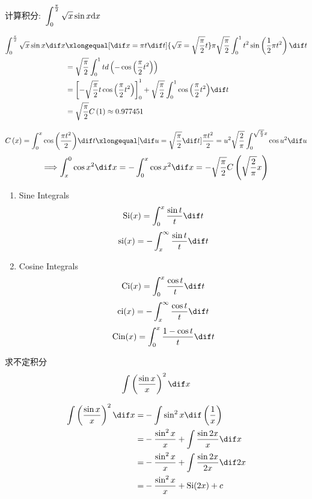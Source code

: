 \documentclass[color=green,titlestyle=hang]{elegantbook}%
\begin{document}
\begin{example}计算积分:~$\displaystyle \int_{\rm{0}}^{\frac{\pi }{{\rm{2}}}} {\sqrt x \sin x} \textrm{d}x$\end{example}
\begin{Solution}\begin{align*}
\int_{0}^{\frac{\pi }{{\rm{2}}}} {\sqrt x \sin x} \dif x &\xlongequal[\dif x = \pi t\dif t]{\sqrt x  = \sqrt {\frac{\pi }{2}} t} \pi \sqrt {\frac{\pi }{2}} \int_0^1 {{t^2}\sin } \left( {\frac{1}{2}\pi {t^2}} \right)\dif t\\
&= \sqrt {\frac{\pi }{2}} \int_0^1 t d\left( { - \cos \left( {\frac{\pi }{2}{t^2}} \right)} \right)\\
&= \left[ { - \sqrt {\frac{\pi }{2}} t\cos \left( {\frac{\pi }{2}{t^2}} \right)} \right]_0^1 + \sqrt {\frac{\pi }{2}} \int_0^1 {\cos \left( {\frac{\pi }{2}{t^2}} \right)} \dif t\\
&= \sqrt {\frac{\pi }{2}} C\left( 1 \right) \approx 0.977451\end{align*}	
\end{Solution}\[C\left( x \right) = \int_0^x {\cos \left( {\frac{{\pi {t^2}}}{2}} \right)} \dif t \xlongequal[{\dif u = \sqrt {\frac{\pi }{2}} \dif t}]{{\frac{{\pi {t^2}}}{2} = {u^2}}}\sqrt {\frac{2}{\pi }} \int_0^{\sqrt {\frac{\pi }{2}} x} {\cos {u^2}\dif u} \]
\[ \Longrightarrow \int_x^0 {\cos {x^2}} \dif x =  - \int_0^x {\cos {x^2}} \dif x =  - \sqrt {\frac{\pi }{2}} C\left( {\sqrt {\frac{2}{\pi }} x} \right)
\]

\begin{newdef}[三角积分函数]
\begin{enumerate}
	\item Sine Integrals \[{\rm Si}(x)=\int_0^x\frac{\sin t}{t}\dif t\]
	\[{\rm si}(x)=-\int_{x}^{\infty}\frac{\sin t}{t}\dif t\]
	\item Cosine Integrals \[{\rm Ci}(x)=\int_0^x\frac{\cos t}{t}\dif t\]
	\[{\rm ci}(x)=-\int_x^{\infty}\frac{\cos t}{t}\dif t\]
	\[{\rm Cin}(x)=\int_0^x\frac{1-\cos t}{t}\dif t\]
\end{enumerate}	
\end{newdef}

\begin{example}求不定积分\[\int\left(\frac{\sin x}{x}\right)^2\dif x\]
\end{example}\begin{Solution}\begin{align*}\int\left(\frac{\sin x}{x}\right)^2\dif x
=&-\int\sin^2x \dif \left(\frac{1}{x}\right)\\
=&-\frac{\sin^2x}{x}+\int\frac{\sin{2x}}{x}\dif x\\
=&-\frac{\sin^2x}{x}+\int\frac{\sin{2x}}{2x}\dif 2x\\
=&-\frac{\sin^2x}{x}+\mathrm{Si}(2x)+c
\end{align*}
\end{Solution}
\end{document}
